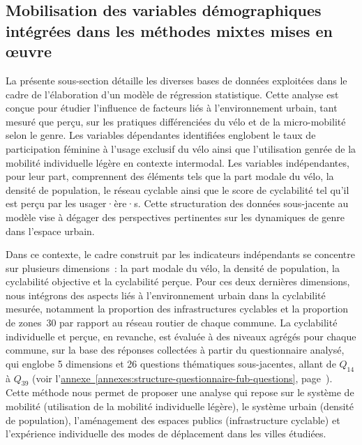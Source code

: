 \begin{refsegment}
\subsection{Mobilisation des variables démographiques intégrées dans les méthodes mixtes mises en œuvre
    \label{chap4:materiau-empirique-genre}
    }

La présente sous-section détaille les diverses bases de données exploitées dans le cadre de l'élaboration d'un modèle de régression statistique. Cette analyse est conçue pour étudier l'influence de facteurs liés à l'environnement urbain, tant mesuré que perçu, sur les pratiques différenciées du vélo et de la micro-mobilité selon le genre. Les variables dépendantes identifiées englobent le taux de participation féminine à l'usage exclusif du vélo ainsi que l'utilisation genrée de la mobilité individuelle légère en contexte intermodal. Les variables indépendantes, pour leur part, comprennent des éléments tels que la part modale du vélo, la densité de population, le réseau cyclable ainsi que le score de cyclabilité tel qu'il est perçu par les usager·ère·s. Cette structuration des données sous-jacente au modèle vise à dégager des perspectives pertinentes sur les dynamiques de genre dans l'espace urbain.%

Dans ce contexte, le cadre construit par les indicateurs indépendants se concentre sur plusieurs dimensions~: la part modale du vélo, la densité de population, la cyclabilité objective et la cyclabilité perçue. Pour ces deux dernières dimensions, nous intégrons des aspects liés à l'environnement urbain dans la cyclabilité mesurée, notamment la proportion des infrastructures cyclables et la proportion de zones~30 par rapport au réseau routier de chaque commune. La cyclabilité individuelle et perçue, en revanche, est évaluée à des niveaux agrégés pour chaque commune, sur la base des réponses collectées à partir du questionnaire analysé, qui englobe 5 dimensions et 26 questions thématiques sous-jacentes, allant de \(Q_{14}\) à \(Q_{39}\) (voir l'\hyperref[annexes:structure-questionnaire-fub-questions]{annexe~\ref{annexes:structure-questionnaire-fub-questions}}, page~\pageref{annexes:structure-questionnaire-fub-questions}). Cette méthode nous permet de proposer une analyse qui repose sur le système de mobilité (utilisation de la mobilité individuelle légère), le système urbain (densité de population), l'aménagement des espaces publics (infrastructure cyclable) et l'expérience individuelle des modes de déplacement dans les villes étudiées.%


\end{refsegment}
